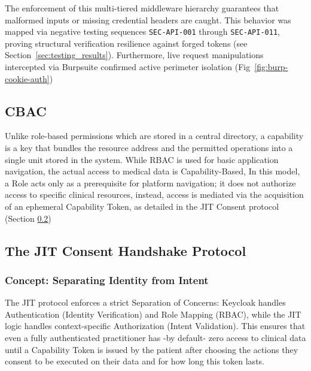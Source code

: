 The enforcement of this multi-tiered middleware hierarchy guarantees that malformed inputs or missing credential headers are caught.
This behavior was mapped via negative testing sequences \texttt{SEC-API-001} through \texttt{SEC-API-011}, proving structural verification resilience against forged tokens (see Section~\ref{sec:testing_results}).
Furthermore, live request manipulations intercepted via Burpsuite confirmed active perimeter isolation (Fig~\ref{fig:burp-cookie-auth})

\subsection{\texorpdfstring{\ac{CBAC}}{CBAC}}
Unlike role-based permissions which are stored in a central directory, a capability is a key that bundles the resource address and the permitted operations into a single unit stored in the system.
While RBAC is used for basic application navigation, the actual access to medical data is Capability-Based, 
In this model, a Role acts only as a prerequisite for platform navigation; 
it does not authorize access to specific clinical resources, instead, 
access is mediated via the acquisition of an ephemeral Capability Token, 
as detailed in the JIT Consent protocol (Section \ref{sec:JIT})


\subsection{The \texorpdfstring{\ac{JIT}}{JIT} Consent Handshake Protocol}\label{sec:JIT}
\subsubsection{Concept: Separating Identity from Intent}

The JIT protocol enforces a strict Separation of Concerns: Keycloak handles Authentication (Identity Verification) and Role Mapping (RBAC), 
while the JIT logic handles context-specific Authorization (Intent Validation). 
This ensures that even a fully authenticated practitioner has -by default- zero access to clinical data until a Capability Token is issued by the patient after choosing the actions they consent to be executed on their data and for how long this token lasts.



